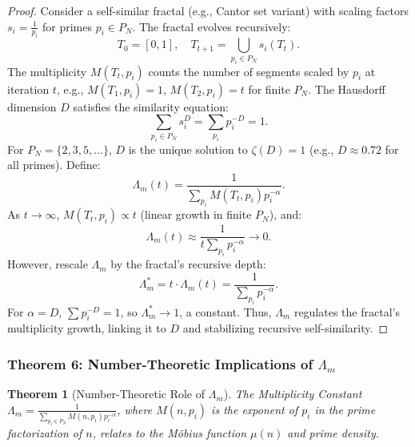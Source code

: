 \documentclass[12pt]{article}
\newtheorem{theorem}{Theorem}[section]
\begin{document}
\begin{proof}
Consider a self-similar fractal (e.g., Cantor set variant) with scaling factors \( s_i = \frac{1}{p_i} \) for primes \( p_i \in P_N \). The fractal evolves recursively:
\[
T_0 = [0, 1], \quad T_{t+1} = \bigcup_{p_i \in P_N} s_i(T_t).
\]
The multiplicity \( M(T_t, p_i) \) counts the number of segments scaled by \( p_i \) at iteration \( t \), e.g., \( M(T_1, p_i) = 1 \), \( M(T_2, p_i) = t \) for finite \( P_N \). The Hausdorff dimension \( D \) satisfies the similarity equation:
\[
\sum_{p_i \in P_N} s_i^D = \sum_{p_i} p_i^{-D} = 1.
\]
For \( P_N = \{2, 3, 5, \ldots\} \), \( D \) is the unique solution to \(\zeta(D) = 1\) (e.g., \( D \approx 0.72 \) for all primes). Define:
\[
\Lambda_m(t) = \frac{1}{\sum_{p_i} M(T_t, p_i) p_i^{-\alpha}}.
\]
As \( t \to \infty \), \( M(T_t, p_i) \propto t \) (linear growth in finite \( P_N \)), and:
\[
\Lambda_m(t) \approx \frac{1}{t \sum_{p_i} p_i^{-\alpha}} \to 0.
\]
However, rescale \(\Lambda_m\) by the fractal’s recursive depth:
\[
\Lambda_m^* = t \cdot \Lambda_m(t) = \frac{1}{\sum_{p_i} p_i^{-\alpha}}.
\]
For \(\alpha = D\), \(\sum p_i^{-D} = 1\), so \(\Lambda_m^* \to 1\), a constant. Thus, \(\Lambda_m\) regulates the fractal’s multiplicity growth, linking it to \( D \) and stabilizing recursive self-similarity.
\end{proof}

\subsubsection{Theorem 6: Number-Theoretic Implications of \(\Lambda_m\)}
\begin{theorem}[Number-Theoretic Role of \(\Lambda_m\)]
The Multiplicity Constant \(\Lambda_m = \frac{1}{\sum_{p_i \in P_N} M(n, p_i) p_i^{-\alpha}}\), where \( M(n, p_i) \) is the exponent of \( p_i \) in the prime factorization of \( n \), relates to the M\"{o}bius function \(\mu(n)\) and prime density.
\end{theorem}
\end{document}
